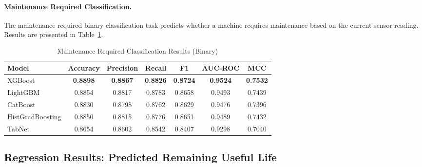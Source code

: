 \paragraph{Maintenance Required Classification.} The maintenance required binary classification task predicts whether a machine requires maintenance based on the current sensor reading. Results are presented in Table~\ref{tab:cls_maint}.
\begin{table}[!htbp]
\centering
\caption{Maintenance Required Classification Results (Binary)}
\label{tab:cls_maint}
\begin{tabular}{lcccccc}
\hline
\textbf{Model} & \textbf{Accuracy} & \textbf{Precision} & \textbf{Recall} & \textbf{F1} & \textbf{AUC-ROC} & \textbf{MCC} \\
\hline
XGBoost              & \textbf{0.8898} & \textbf{0.8867} & \textbf{0.8826} & \textbf{0.8724} & \textbf{0.9524} & \textbf{0.7532} \\
LightGBM             & 0.8854 & 0.8817 & 0.8783 & 0.8658 & 0.9493 & 0.7439 \\
CatBoost             & 0.8830 & 0.8798 & 0.8762 & 0.8629 & 0.9476 & 0.7396 \\
HistGradBoosting     & 0.8850 & 0.8815 & 0.8776 & 0.8651 & 0.9489 & 0.7432 \\
TabNet               & 0.8654 & 0.8602 & 0.8542 & 0.8407 & 0.9298 & 0.7040 \\
\hline
\end{tabular}
\end{table}
\subsection{Regression Results: Predicted Remaining Useful Life}

